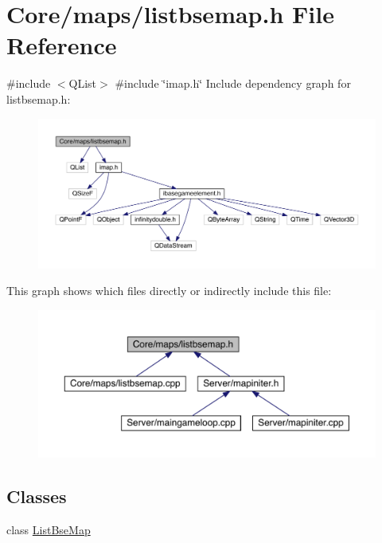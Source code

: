 \hypertarget{a00065}{}\section{Core/maps/listbsemap.h File Reference}
\label{a00065}
{\ttfamily \#include $<$Q\+List$>$}\newline
{\ttfamily \#include \char`\"{}imap.\+h\char`\"{}}\newline
Include dependency graph for listbsemap.\+h\+:
\nopagebreak
\begin{figure}[H]
\begin{center}
\leavevmode
\includegraphics[width=350pt]{d9/db3/a00066}
\end{center}
\end{figure}
This graph shows which files directly or indirectly include this file\+:
\nopagebreak
\begin{figure}[H]
\begin{center}
\leavevmode
\includegraphics[width=350pt]{dc/ddf/a00067}
\end{center}
\end{figure}
\subsection*{Classes}
\begin{DoxyCompactItemize}
\item 
class \hyperlink{a00169}{List\+Bse\+Map}
\end{DoxyCompactItemize}
